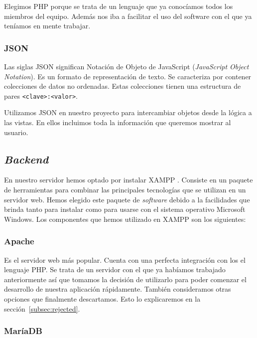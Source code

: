 Elegimos PHP porque se trata de un lenguaje que ya conocíamos todos los miembros del equipo. Además nos iba a facilitar el uso del software con el que ya teníamos en mente trabajar. \par 

\subsubsection{JSON}
Las siglas JSON significan Notación de Objeto de JavaScript (\textit{JavaScript Object Notation}). Es un formato de representación de texto. Se caracteriza por contener colecciones de datos no ordenadas. Estas colecciones tienen una estructura de pares \texttt{<clave>:<valor>}.\par

Utilizamos JSON en nuestro proyecto para intercambiar objetos desde la lógica a las vistas. En ellos incluimos toda la información que queremos mostrar al usuario. \par

\subsection{\textit{Backend}}

En nuestro servidor hemos optado por instalar XAMPP \cite{XAMPP}. Consiste en un paquete de herramientas para combinar las principales tecnologías que se utilizan en un servidor web. Hemos elegido este paquete de \textit{software} debido a la facilidades que brinda tanto para instalar como para usarse con el sistema operativo Microsoft Windows. Los componentes que hemos utilizado en XAMPP son los siguientes: \par

\subsubsection{Apache}

Es el servidor web más popular. Cuenta con una perfecta integración con los el lenguaje PHP. Se trata de un servidor con el que ya habíamos trabajado anteriormente así que tomamos la decisión de utilizarlo para poder comenzar el desarrollo de nuestra aplicación rápidamente. También consideramos otras opciones que finalmente descartamos. Esto lo explicaremos en la sección~\ref{subsec:rejected}. \par 

\subsubsection{MaríaDB}

